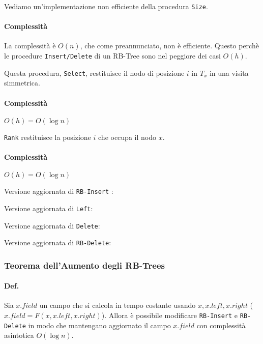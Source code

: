 \par
Vediamo un'implementazione non efficiente della procedura \texttt{Size}.

 

\paragraph{Complessità} La complessità è $O(n)$, che come preannunciato, non è efficiente.
Questo perchè le procedure \texttt{Insert/Delete} di un RB-Tree sono nel peggiore dei casi $O(h)$.

\bigskip Questa procedura, \texttt{Select}, restituisce il nodo di posizione $i$
in $T_x$ in una visita simmetrica.

 

\paragraph{Complessità} $O(h) = O(\log n)$

\texttt{Rank} restituisce la posizione $i$ che occupa il nodo $x$.



\paragraph{Complessità} $O(h) = O(\log n)$

\bigskip Versione aggiornata di \texttt{RB-Insert} :



Versione aggiornata di \texttt{Left}:



Versione aggiornata di \texttt{Delete}:



Versione aggiornata di \texttt{RB-Delete}:




\subsubsection{Teorema dell'Aumento degli RB-Trees}

\paragraph{Def.} Sia $x.field$ un campo che si calcola in tempo costante
usando $x, x.left, x.right$ ($x.field = F(x, x.left, x.right)$).
Allora è possibile modificare \texttt{RB-Insert} e \texttt{RB-Delete}
in modo che mantengano aggiornato il campo $x.field$ con complessità
asintotica $O(\log n)$.

